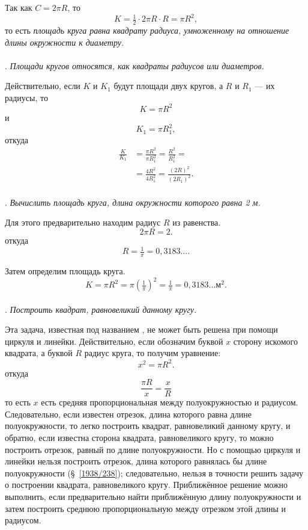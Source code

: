 \documentclass[oneside]{book}
\begin{document}
Так как $C=2\pi R$, то
\[K=\tfrac12\cdot 2\pi  R\cdot R=\pi R^2,\]
то есть \emph{площадь круга равна квадрату радиуса, умноженному на отношение длины окружности к диаметру.}

\paragraph{}\label{1938/265}
.
\emph{Площади кругов относятся, как квадраты радиусов или диаметров.}

Действительно, если $K$ и $K_1$ будут площади двух кругов, а $R$ и $R_1$ — их радиусы, то
\[K=\pi R^2\]
и
\[K_1=\pi R_1^2,\]
откуда
\begin{align*}
\frac{K}{K_1}&=\frac{\pi R^2}{\pi R^2_1}=\frac{R^2}{R^2_1}=
\\
&=\frac{4R^2}{4R^2_1}=\frac{(2R)^2}{(2R_1)^2}.
\end{align*}


\paragraph{}\label{1938/266}
.
\emph{Вычислить площадь круга, длина окружности которого равна 2 м.}

Для этого предварительно находим радиус $R$ из равенства.
\[2\pi R= 2.\]
откуда
\[R=\tfrac1\pi=0{,}3183\dots.\]

Затем определим площадь круга.
\[K=\pi R^2=\pi(\tfrac1\pi)^2=\tfrac1\pi=0{,}3183\dots\text{м}^2.\]

\paragraph{}\label{1938/267}
.
\emph{Построить квадрат, равновеликий данному кругу.}

Эта задача, известная под названием , не может быть решена при помощи циркуля и линейки.
Действительно, если обозначим буквой $x$ сторону искомого квадрата, а буквой $R$ радиус круга, то получим уравнение:
\[x^2=\pi R^2.\]
откуда
\[\frac{\pi R}{x}=\frac{x}{R}\]
то есть
$x$ есть средняя пропорциональная между полуокружностью и радиусом.
Следовательно, если известен отрезок, длина которого равна длине полуокружности, то легко построить квадрат, равновеликий данному кругу, и обратно, если известна сторона квадрата, равновеликого кругу, то можно построить отрезок, равный по длине полуокружности.
Но с помощью циркуля и линейки нельзя построить отрезок, длина которого равнялась бы длине полуокружности (§~\ref{1938/238});
следовательно, нельзя в точности решить задачу о построении квадрата, равновеликого кругу.
Приближённое решение можно выполнить, если предварительно найти приближённую длину полуокружности и затем построить среднюю пропорциональную между отрезком этой длины и радиусом.
\end{document}
